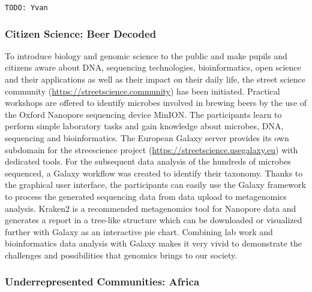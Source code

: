 \documentclass[10pt,letterpaper]{article}
\begin{document}
\verb+TODO: Yvan+

\subsubsection*{Citizen Science: Beer Decoded}

To introduce biology and genomic science to the public and make pupils and citizens aware about DNA, sequencing technologies, bioinformatics, open science and their applications as well as their impact on their daily life, the street science community (\url{https://streetscience.community}) has been initiated.
Practical workshops are offered to identify microbes involved in brewing beers by the use of the Oxford Nanopore sequencing device MinION.
The participants learn to perform simple laboratory tasks and gain knowledge about microbes, DNA, sequencing and bioinformatics.
The European Galaxy server provides its own subdomain for the streescience project (\url{https://streetscience.usegalaxy.eu}) with dedicated tools.
For the subsequent data analysis of the hundreds of microbes sequenced, a Galaxy workflow was created to identify their taxonomy.
Thanks to the graphical user interface, the participants can easily use the Galaxy framework to process the generated sequencing data from data upload to  metagenomics analysis.
Kraken2 \cite{TODO} is a recommended metagenomics tool for Nanopore data and generates a report in a tree-like structure which can be downloaded or visualized further with Galaxy as an interactive pie chart.
Combining lab work and bioinformatics data analysis with Galaxy makes it very vivid to demonstrate the challenges and possibilities that genomics brings to our society.


\subsubsection*{Underrepresented Communities: Africa}
\end{document}
